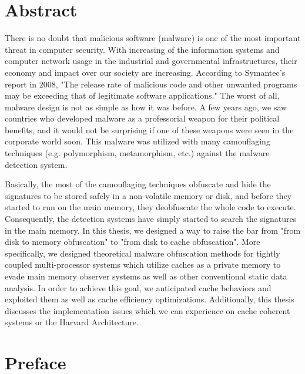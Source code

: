 \documentclass[medieteknikk]{gucmasterthesis}
\begin{document}
	\thesisdate{\gucmasterthesisdate}
\makefrontpages %
\thesistitlepage %


\chapter*{Abstract}

There is no doubt that malicious software (malware) is one of the most important threat in computer security. With increasing of the information systems and computer network usage in the industrial and governmental infrastructures, their economy and impact over our society are increasing. According to Symantec's report in 2008\cite{turner2008symantec}, "The release rate of malicious code and other unwanted programs may be exceeding that of legitimate software applications." The worst of all, malware design is not as simple as how it was before. A few years ago, we saw countries who developed malware as a professorial weapon for their political benefits, and it would not be surprising if one of these weapons were seen in the corporate world soon. This malware was utilized with many camouflaging techniques (e.g. polymorphism, metamorphism, etc.) against the malware detection system.

Basically, the most of the camouflaging techniques obfuscate and hide the signatures to be stored safely in a non-volatile memory or disk, and before they started to run on the main memory, they deobfuscate the whole code to execute. Consequently, the detection systems have simply started to search the signatures in the main memory. In this thesis, we designed a way to raise the bar from "from disk to memory obfuscation" to "from disk to cache obfuscation". More specifically, we designed theoretical malware obfuscation methods for tightly coupled multi-processor systems which utilize caches as a private memory to evade main memory observer systems as well as other conventional static data analysis. In order to achieve this goal, we anticipated cache behaviors and exploited them as well as cache efficiency optimizations. Additionally, this thesis discusses the implementation issues which we can experience on cache coherent systems or the Harvard Architecture.

\chapter*{Preface}
\end{document}
